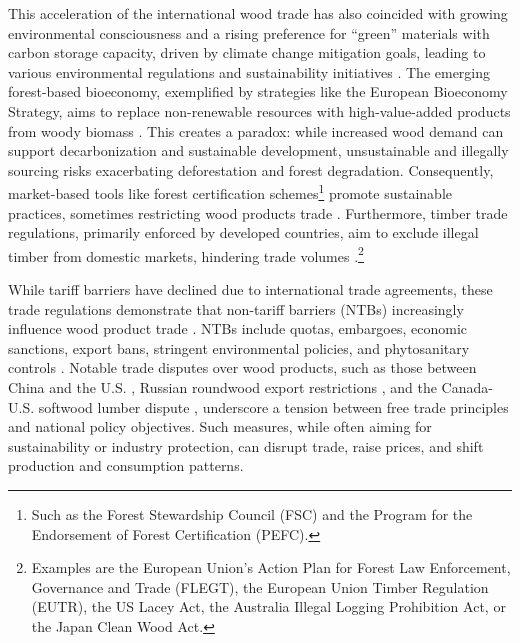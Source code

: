 \documentclass[
  authoryear,
  review,
  3p]{elsarticle}
\begin{document}
This acceleration of the international wood trade has also coincided
with growing environmental consciousness and a rising preference for
``green'' materials with carbon storage capacity, driven by climate
change mitigation goals, leading to various environmental regulations
and sustainability initiatives \citep{prestemon_international_2003}. The
emerging forest-based bioeconomy, exemplified by strategies like the
European Bioeconomy Strategy, aims to replace non-renewable resources
with high-value-added products from woody biomass
\citep{wolfslehner_forest_2016, winkel_towards_2017}. This creates a
paradox: while increased wood demand can support decarbonization and
sustainable development, unsustainable and illegally sourcing risks
exacerbating deforestation and forest degradation. Consequently,
market-based tools like forest certification schemes\footnote{Such as
  the Forest Stewardship Council (FSC) and the Program for the
  Endorsement of Forest Certification (PEFC).} promote sustainable
practices, sometimes restricting wood products trade
\citep{guan_restricting_2019, chen_effect_2020, boubacar_sustainable_2025}.
Furthermore, timber trade regulations, primarily enforced by developed
countries, aim to exclude illegal timber from domestic markets,
hindering trade volumes
\citep{moral-pajares_transparency_2020, rougieux_impacts_2021, apeti_impact_2023, kim_analyzing_2024}.\footnote{Examples
  are the European Union's Action Plan for Forest Law Enforcement,
  Governance and Trade (FLEGT), the European Union Timber Regulation
  (EUTR), the US Lacey Act, the Australia Illegal Logging Prohibition
  Act, or the Japan Clean Wood Act.}

While tariff barriers have declined due to international trade
agreements, these trade regulations demonstrate that non-tariff barriers
(NTBs) increasingly influence wood product trade
\citep{unecefao_forest_2022-1}. NTBs include quotas, embargoes, economic
sanctions, export bans, stringent environmental policies, and
phytosanitary controls
\citep{li_potential_2007, sun_impacts_2010, buongiorno_potential_2018, unecefao_forest_2022, fao_global_2024}.
Notable trade disputes over wood products, such as those between China
and the U.S. \citep{muhammad_end_2021, pan_impacts_2021}, Russian
roundwood export restrictions
\citep{turner_implications_2008, solberg_forest_2010, lin_incidence_2017, guan_impact_2024},
and the Canada-U.S. softwood lumber dispute
\citep{van_kooten_global_2014, johnston_impact_2017}, underscore a
tension between free trade principles and national policy objectives.
Such measures, while often aiming for sustainability or industry
protection, can disrupt trade, raise prices, and shift production and
consumption patterns.
\end{document}
